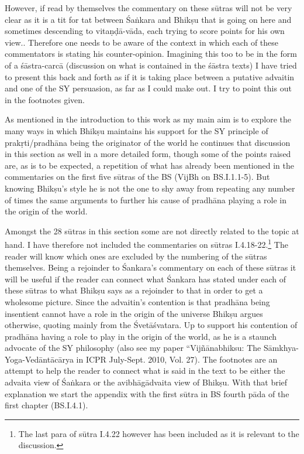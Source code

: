 However, if read by themselves the commentary on these sūtras will not be very clear as it is a tit for tat between Śaṅkara and Bhikṣu that is going on here and sometimes descending to vitaṇḍā-vāda, each trying to score points for his own view.. Therefore one needs to be aware of the context in which each of these commentators is stating his counter-opinion. Imagining this too to be in the form of a śāstra-carcā (discussion on what is contained in the śāstra texts) I have tried to present this back and forth as if it is taking place between a  putative advaitin and one of the SY persuasion, as far as I could make out. I try to point this out in the footnotes given.

As mentioned in the introduction to this work as my main aim is to explore the many ways in which Bhikṣu maintains his support for the SY principle of prakṛti/pradhāna being the originator of the world he continues that discussion in this section as well in a more detailed form, though some of the points raised are, as is to be expected, a repetition of what has already been mentioned in the commentaries on the first five sūtras of the BS (VijBh on BS.I.1.1-5). But knowing Bhikṣu’s style he is not the one to shy away from repeating any number of times the same arguments to further his cause of pradhāna playing a role in the origin of the world.

Amongst the 28 sūtras in this section some are not directly related to the topic at hand. I have therefore not included     the commentaries on sūtras I.4.18-22.\footnote{The last para of sūtra I.4.22 however has been included as it is relevant to the discussion.} The reader will know which ones are excluded by the numbering of the sūtras themselves. Being a rejoinder to Śankara’s commentary on each of these sūtras it will be useful if the reader can connect what Śankara has stated under each of these sūtras to what Bhikṣu says as a rejoinder to that in order to get a wholesome picture.  Since the advaitin’s contention is that pradhāna being insentient cannot have a role in the origin of the universe Bhikṣu argues otherwise, quoting mainly from the Śvetāśvatara. Up to support his contention of pradhāna having a role to play in the origin of the world, as he is a staunch advocate of the SY philosophy (also see my paper  “Vijñānabhiksu: The Sāmkhya-Yoga-Vedāntācārya in ICPR July-Sept. 2010, Vol. 27).  The footnotes are an attempt to help the reader to connect what is said in the text to be either the advaita view of Śaṅkara or the avibhāgādvaita view  of   Bhikṣu.  With that brief explanation we start the appendix with the first sūtra in BS fourth pāda of the first chapter (BS.I.4.1).

